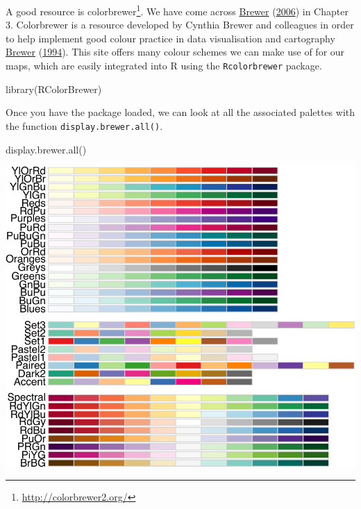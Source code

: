 \documentclass[
  krantz2]{krantz}
\makeatletter
\newenvironment{Shaded}{\begin{snugshade}}{\end{snugshade}}
\newcommand{\FunctionTok}[1]{\textcolor[rgb]{0,0,0}{#1}}
\newcommand{\NormalTok}[1]{#1}
\renewcommand{\href}[2]{#2\footnote{\url{#1}}}
\newenvironment{kframe}{%
\medskip{}
\setlength{\fboxsep}{.8em}
 \def\at@end@of@kframe{}%
 \ifinner\ifhmode%
  \def\at@end@of@kframe{\end{minipage}}%
  \begin{minipage}{\columnwidth}%
 \fi\fi%
 \def\FrameCommand##1{\hskip\@totalleftmargin \hskip-\fboxsep
 \colorbox{shadecolor}{##1}\hskip-\fboxsep
     \hskip-\linewidth \hskip-\@totalleftmargin \hskip\columnwidth}%
 \MakeFramed {\advance\hsize-\width
   \@totalleftmargin\z@ \linewidth\hsize
   \@setminipage}}%
 {\par\unskip\endMakeFramed%
 \at@end@of@kframe}
\renewenvironment{Shaded}{\begin{kframe}}{\end{kframe}}
\makeatother
\begin{document}
A good resource is \href{http://colorbrewer2.org/}{colorbrewer}. We have come across \protect\hyperlink{ref-Brewer_2006}{Brewer} (\protect\hyperlink{ref-Brewer_2006}{2006}) in Chapter 3. Colorbrewer is a resource developed by Cynthia Brewer and colleagues in order to help implement good colour practice in data visualisation and cartography \protect\hyperlink{ref-Brewer_1994}{Brewer} (\protect\hyperlink{ref-Brewer_1994}{1994}). This site offers many colour schemes we can make use of for our maps, which are easily integrated into R using the \texttt{Rcolorbrewer} package.

\begin{Shaded}
\begin{Highlighting}[]
\FunctionTok{library}\NormalTok{(RColorBrewer)}
\end{Highlighting}
\end{Shaded}

Once you have the package loaded, we can look at all the associated palettes with the function \texttt{display.brewer.all()}.

\begin{Shaded}
\begin{Highlighting}[]
\FunctionTok{display.brewer.all}\NormalTok{()}
\end{Highlighting}
\end{Shaded}

\includegraphics{crime_mapping_files/figure-latex/dsplayallcolourbrewerpallettes-1.pdf}
\end{document}
